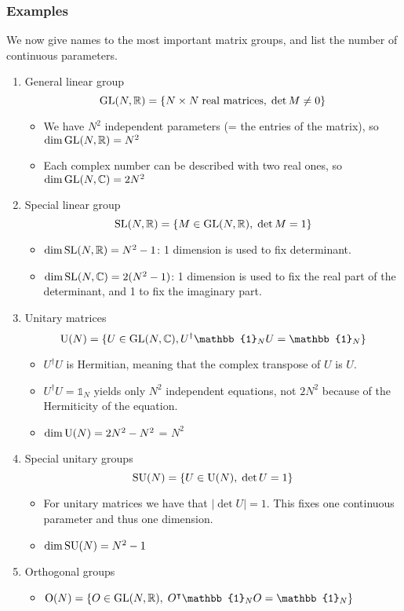 \subsubsection{Examples}
We now give names to the most important matrix groups, and list the number of continuous parameters.
\begin{enumerate}
\item General linear group
\[ \operatorname{GL}(N,\mathbb{R}) = \{N\times N \;\text{real matrices}, \; \det M \neq 0\} \]
\begin{itemize}
\item We have $N^2$ independent parameters (= the entries of the matrix), so $\dim \operatorname{GL}(N,\mathbb{R}) = N^2$
\item Each complex number can be described with two real ones, so $\dim \operatorname{GL}(N, \mathbb{C}) = 2N^2$
\end{itemize}
\item Special linear group
\[ \operatorname{SL}(N,\mathbb{R}) = \{M\in\operatorname{GL}(N,\mathbb{R}), \;\det M = 1\} \]
\begin{itemize}
\item $\dim \operatorname{SL}(N,\mathbb{R}) = N^2-1$: 1 dimension is used to fix determinant.
\item $\dim \operatorname{SL}(N,\mathbb{C}) = 2(N^2-1)$: 1 dimension is used to fix the real part of the determinant, and 1 to fix the imaginary part.
\end{itemize}
\item Unitary matrices
\[ \U(N) = \{U\in\GL(N,\C), U^\dagger\mathbb{1}_NU = \mathbb{1}_N\} \]
\begin{itemize}
\item $U^\dagger U$ is Hermitian, meaning that the complex transpose of $U$ is $U$.
\item $U^\dagger U = \mathbb{1}_N$ yields only $N^2$ independent equations, not $2N^2$ because of the Hermiticity of the equation.
\item $\dim \operatorname{U}(N) = 2N^2-N^2$ = $N^2$
\end{itemize}
\item Special unitary groups
\[ \operatorname{SU}(N) = \{U\in\operatorname{U}(N),\; \det U = 1\} \]
\begin{itemize}
\item For unitary matrices we have that $|\det U| = 1$. This fixes one continuous parameter and thus one dimension.
\item $\dim \operatorname{SU}(N) = N^2 - 1$
\end{itemize}
\item Orthogonal groups
\begin{itemize}
\item $\Ogroup(N) = \{O\in\GL(N,\R),\; O^\intercal\mathbb{1}_N O = \mathbb{1}_N\}$

\end{itemize}
\end{enumerate}
